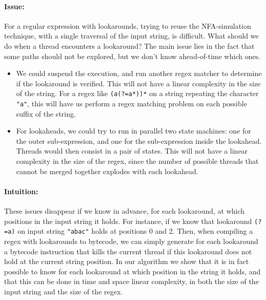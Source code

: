 \documentclass{article}
\def\regex#1{\lstinline[style=rgx]{#1}}
\def\str#1{\texttt{"#1"}}
\begin{document}
\paragraph{Issue:}
For a regular expression with lookarounds, trying to reuse the NFA-simulation technique, with a single traversal of the input string, is difficult.
What should we do when a thread encounters a lookaround? The main issue lies in the fact that some paths should not be explored, but we don't know ahead-of-time which ones.
\begin{itemize}
\item We could suspend the execution, and run another regex matcher to determine if the lookaround is verified.
  This will not have a linear complexity in the size of the string. For a regex like \regex{(a(?=a*))*} on a string repeating the character \str{a}, this will have us perform a regex matching problem on each possible suffix of the string.
\item For lookaheads, we could try to run in parallel two state machines: one for the outer sub-expression, and one for the sub-expression inside the lookahead. Threads would then consist in a pair of states.
  This will not have a linear complexity in the size of the regex, since the number of possible threads that cannot be merged together explodes with each lookahead.
\end{itemize}


\paragraph{Intuition:}
These issues disappear if we know in advance, for each lookaround, at which positions in the input string it holds.
For instance, if we know that lookaround \regex{(?=a)} on input string \str{abac} holds at positions 0 and 2.
Then, when compiling a regex with lookarounds to bytecode, we can simply generate for each lookaround a bytecode instruction that kills the current thread if this lookaround does not hold at the current string position.
In our algorithm we show that it is in fact possible to know for each lookaround at which position in the string it holds, and that this can be done in time and space linear complexity, in both the size of the input string and the size of the regex.
\end{document}
